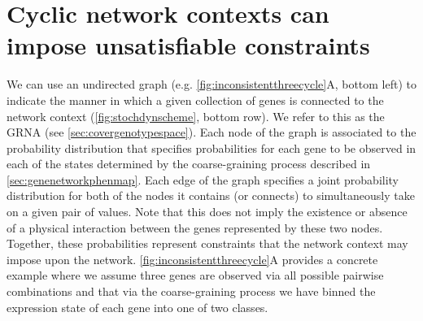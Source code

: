 \section{Cyclic network contexts can impose unsatisfiable constraints}\label{sec:cycliccontextunsatisfiableconstraints}

We can use an undirected graph (e.g. \ref{fig:inconsistentthreecycle}A, bottom left) to indicate the manner in which a given collection of genes is connected to the network context (\ref{fig:stochdynscheme}, bottom row). We refer to this as the GRNA (see \ref{sec:covergenotypespace}). Each node of the graph is associated to the probability distribution that specifies probabilities for each gene to be observed in each of the states determined by the coarse-graining process described in \ref{sec:genenetworkphenmap}. Each edge of the graph specifies a joint probability distribution for both of the nodes it contains (or connects) to simultaneously take on a given pair of values. Note that this does not imply the existence or absence of a physical interaction between the genes represented by these two nodes. Together, these probabilities represent constraints that the network context may impose upon the network.
\ref{fig:inconsistentthreecycle}A provides a concrete example where we assume three genes are observed via all possible pairwise combinations and that via the coarse-graining process we have binned the expression state of each gene into one of two classes.
